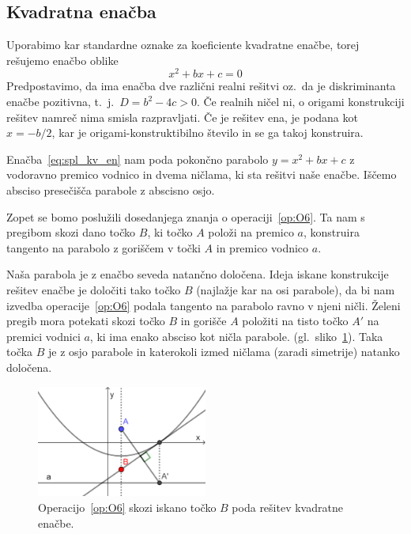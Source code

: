 \subsection{Kvadratna enačba}

Uporabimo kar standardne oznake za koeficiente kvadratne enačbe, torej rešujemo enačbo oblike
\begin{equation}
    \label{eq:spl_kv_en}
    x^2 + bx + c = 0
\end{equation}
Predpostavimo, da ima enačba dve različni realni rešitvi oz.\ da je diskriminanta enačbe pozitivna, t.\ j.\ $D = b^2 - 4c > 0$. Če realnih ničel ni, o origami konstrukciji rešitev namreč nima smisla razpravljati. Če je rešitev ena, je podana kot $x = -b/2$, kar je origami-konstruktibilno število in se ga takoj konstruira.

Enačba~\ref{eq:spl_kv_en} nam poda pokončno parabolo $y = x^2 + bx + c$ z vodoravno premico vodnico in dvema ničlama, ki sta rešitvi naše enačbe. Iščemo absciso presečišča parabole z abscisno osjo.

Zopet se bomo poslužili dosedanjega znanja o operaciji~\ref{op:O6}. Ta nam s pregibom skozi dano točko $B$, ki točko $A$ položi na premico $a$, konstruira tangento na parabolo z goriščem v točki $A$ in premico vodnico $a$.

Naša parabola je z enačbo seveda natančno določena. Ideja iskane konstrukcije rešitev enačbe je določiti tako točko $B$ (najlažje kar na osi parabole), da bi nam izvedba operacije~\ref{op:O6} podala tangento na parabolo ravno v njeni ničli. Želeni pregib mora potekati skozi točko $B$ in gorišče $A$ položiti na tisto točko $A'$ na premici vodnici $a$, ki ima enako absciso kot ničla parabole. (gl.\ sliko~\ref{fig:tockaB_in_O6}). Taka točka $B$ je z osjo parabole in katerokoli izmed ničlama (zaradi simetrije) natanko določena.

\begin{figure}[h]
    \centering
    \includegraphics[width=0.5\textwidth]{images/kvadratna_enacba/tockaB_in_O6.png}
    \caption[Iskanje točke $B$]{Operacijo~\ref{op:O6} skozi iskano točko $B$ poda rešitev kvadratne enačbe.}
    \label{fig:tockaB_in_O6}
\end{figure}

